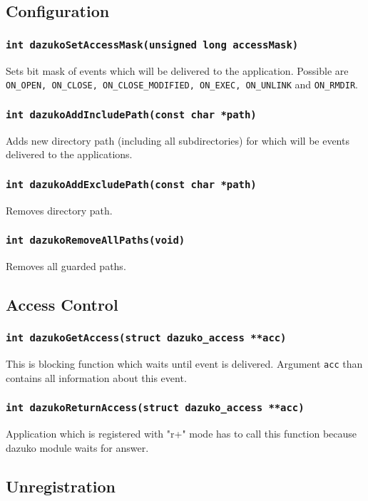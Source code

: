 \subsection*{Configuration}
\subsubsection{\texttt{int dazukoSetAccessMask(unsigned long accessMask)}}
Sets bit mask of events which will be delivered to the application. Possible are
\texttt{ON\_OPEN, ON\_CLOSE, ON\_CLOSE\_MODIFIED, ON\_EXEC, ON\_UNLINK} and
\texttt{ON\_RMDIR}.

\subsubsection{\texttt{int dazukoAddIncludePath(const char *path)}}
Adds new directory path (including all subdirectories) for which will be events
delivered to the applications.

\subsubsection{\texttt{int dazukoAddExcludePath(const char *path)}}
Removes directory path.

\subsubsection{\texttt{int dazukoRemoveAllPaths(void)}}
Removes all guarded paths.

\subsection*{Access Control}
\subsubsection{\texttt{int dazukoGetAccess(struct dazuko\_access **acc)}}
This is blocking function which waits until event is delivered. Argument \texttt{acc}
than contains all information about this event.

\subsubsection{\texttt{int dazukoReturnAccess(struct dazuko\_access **acc)}}
Application which is registered with "r+" mode has to call this function because
dazuko module waits for answer.

\subsection*{Unregistration}
